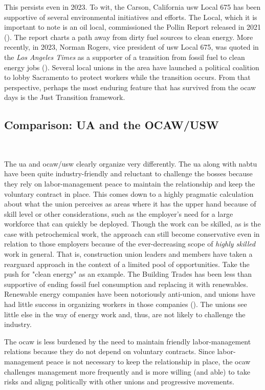 \documentclass[12pt]{article}
\begin{document}
This persists even in 2023. To wit, the Carson, California \acrshort{usw} Local 675 has been supportive of several environmental initiatives and efforts. The Local, which it is important to note is an oil local, commissioned the Pollin Report released in 2021 (\cite{pollinProgramEconomicRecovery2021}). The report charts a path away from dirty fuel sources to clean energy. More recently, in 2023, Norman Rogers, vice president of \acrshort{usw} Local 675, was quoted in the \textit{Los Angeles Times} as a supporter of a transition from fossil fuel to clean energy jobs (\cite{rothCanClimateActivists2023}). Several local unions in the area have launched a political coalition to lobby Sacramento to protect workers while the transition occurs. From that perspective, perhaps the most enduring feature that has survived from the \acrshort{ocaw} days is the Just Transition framework.

\subsection{Comparison: UA and the OCAW/USW}\

The \acrfull{ua} and \acrshort{ocaw}/\acrshort{usw} clearly organize very differently. The \acrshort{ua} along with \acrfull{nabtu} have been quite industry-friendly and reluctant to challenge the bosses because they rely on labor-management peace to maintain the relationship and keep the voluntary contract in place. This comes down to a highly pragmatic calculation about what the union perceives as areas where it has the upper hand because of skill level or other considerations, such as the employer's need for a large workforce that can quickly be deployed. Though the work can be skilled, as is the case with petrochemical work, the approach can still become conservative even in relation to those employers because of the ever-decreasing scope of \emph{highly skilled} work in general. That is, construction union leaders and members have taken a rearguard approach in the context of a limited pool of opportunities. Take the push for "clean energy" as an example. The Building Trades has been less than supportive of ending fossil fuel consumption and replacing it with renewables. Renewable energy companies have been notoriously anti-union, and unions have had little success in organizing workers in those companies (\cite{scheiberBuildingSolarFarms2021}). The unions see little else in the way of energy work and, thus, are not likely to challenge the industry.

The \acrshort{ocaw} is less burdened by the need to maintain friendly labor-management relations because they do not depend on voluntary contracts. Since labor-management peace is not necessary to keep the relationship in place, the  \acrshort{ocaw} challenges management more frequently and is more willing (and able) to take risks and aligng politically with other unions and progressive movements.
\end{document}
